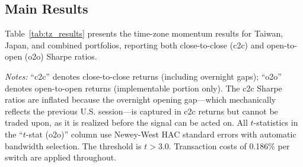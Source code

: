 \subsection{Main Results}

Table~\ref{tab:tz_results} presents the time-zone momentum results for Taiwan, Japan, and combined portfolios, reporting both close-to-close (c2c) and open-to-open (o2o) Sharpe ratios.

\begin{table}[H]
\centering
\caption{Time-Zone Momentum Strategy Performance: Close-to-Close vs.\ Open-to-Open}
\label{tab:tz_results}
\begin{flushleft}
\small \textit{Notes:} ``c2c'' denotes close-to-close returns (including overnight gaps); ``o2o'' denotes open-to-open returns (implementable portion only). The c2c Sharpe ratios are inflated because the overnight opening gap---which mechanically reflects the previous U.S. session---is captured in c2c returns but cannot be traded upon, as it is realized before the signal can be acted on. All $t$-statistics in the ``$t$-stat (o2o)'' column use Newey-West HAC standard errors with automatic bandwidth selection. The \citet{harvey2016} threshold is $t > 3.0$. Transaction costs of 0.186\% per switch are applied throughout.
\end{flushleft}
\end{table}

